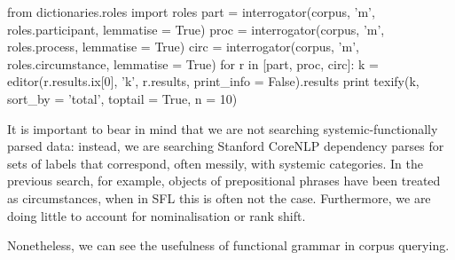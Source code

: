\begin{singlespacing}
\begin{pyverbatim}
from dictionaries.roles import roles
part = interrogator(corpus, 'm', roles.participant, lemmatise = True)
proc = interrogator(corpus, 'm', roles.process, lemmatise = True)
circ = interrogator(corpus, 'm', roles.circumstance, lemmatise = True)
for r in [part, proc, circ]:
    k = editor(r.results.ix[0], 'k', r.results, print_info = False).results
    print texify(k, sort_by = 'total', toptail = True, n = 10)
\end{pyverbatim}
\end{singlespacing}

It is important to bear in mind that we are not searching systemic-functionally parsed data: instead, we are searching Stanford CoreNLP dependency parses for sets of labels that correspond, often messily, with systemic categories. In the previous search, for example, objects of prepositional phrases have been treated as circumstances, when in SFL this is often not the case. Furthermore, we are doing little to account for nominalisation or rank shift.

Nonetheless, we can see the usefulness of functional grammar in corpus querying.


% 
% 
% 
% 
% 
 

